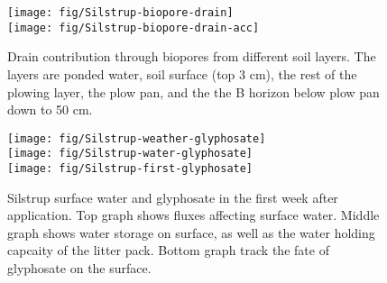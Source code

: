 \begin{figure}[htbp]
  \begin{center}
    \texttt{[image: fig/Silstrup-biopore-drain]}\\
    \texttt{[image: fig/Silstrup-biopore-drain-acc]}
  \end{center}
  \caption{Drain contribution through biopores from different soil
    layers.  The layers are ponded water, soil surface (top 3 cm), the
    rest of the plowing layer, the plow pan, and the the B horizon
    below plow pan down to 50 cm.}
  \label{fig:Silstrup-biopore-drain}
\end{figure}\FloatBarrier

\begin{figure}[htbp]
  \begin{center}
    \texttt{[image: fig/Silstrup-weather-glyphosate]}\\
    \texttt{[image: fig/Silstrup-water-glyphosate]}\\
    \texttt{[image: fig/Silstrup-first-glyphosate]}
  \end{center}
  \caption{Silstrup surface water and glyphosate in the first week
    after application.  Top graph shows fluxes affecting surface
    water.  Middle graph shows water storage on surface, as well as
    the water holding capcaity of the litter pack.  Bottom graph track
    the fate of glyphosate on the surface.}
  \label{fig:Silstrup-weather-glyphosate}
\end{figure}\FloatBarrier

